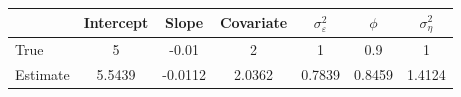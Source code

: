 \begin{tabular}{lcccccc}
\toprule
& Intercept & Slope & Covariate & $\sigma_\varepsilon^2$ & $\phi$ & $\sigma_\eta^2$ \\
\midrule
True & 5 & -0.01 & 2 & 1 & 0.9 & 1 \\
Estimate & 5.5439 & -0.0112 & 2.0362 & 0.7839 & 0.8459 & 1.4124 \\
\bottomrule
\end{tabular}
